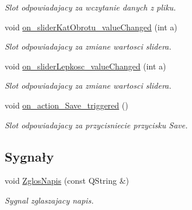 \begin{DoxyCompactItemize}
\begin{DoxyCompactList}\small\item\em Slot odpowiadajacy za wczytanie danych z pliku. \end{DoxyCompactList}\item 
void \hyperlink{class_okno_glowne_a13edcaa9e3c75c793db2b147b2ffd12b}{on\-\_\-slider\-Kat\-Obrotu\-\_\-value\-Changed} (int a)
\begin{DoxyCompactList}\small\item\em Slot odpowiadajacy za zmiane wartosci slidera. \end{DoxyCompactList}\item 
void \hyperlink{class_okno_glowne_adfdca80447e54a1a934c80bf0420004b}{on\-\_\-slider\-Lepkosc\-\_\-value\-Changed} (int a)
\begin{DoxyCompactList}\small\item\em Slot odpowiadajacy za zmiane wartosci slidera. \end{DoxyCompactList}\item 
void \hyperlink{class_okno_glowne_a8ed8fc49c9c3d3e187639880ce286c88}{on\-\_\-action\-\_\-\-Save\-\_\-triggered} ()
\begin{DoxyCompactList}\small\item\em Slot odpowiadajacy za przycisniecie przycisku Save. \end{DoxyCompactList}\end{DoxyCompactItemize}
\subsection*{Sygnały}
\begin{DoxyCompactItemize}
\item 
void \hyperlink{class_okno_glowne_aa602a0c5a940f0af4ab7390bfc1a4b9d}{Zglos\-Napis} (const Q\-String \&)
\begin{DoxyCompactList}\small\item\em Sygnal zglaszajacy napis. \end{DoxyCompactList}\end{DoxyCompactItemize}
